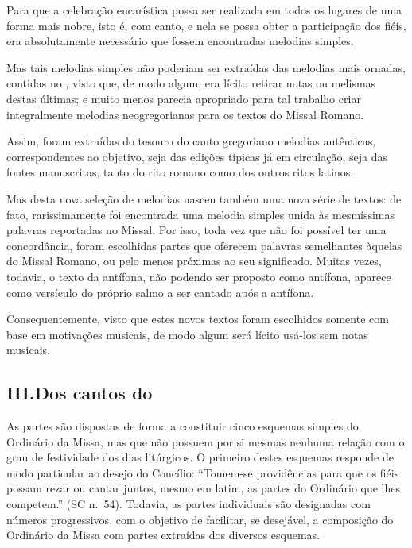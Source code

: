  Para que a celebração eucarística possa ser realizada em todos os lugares de uma forma mais nobre, isto é, com canto, e nela se possa obter a participação dos fiéis, era absolutamente necessário que fossem encontradas melodias simples.

 Mas tais melodias simples não poderiam ser extraídas das melodias mais ornadas, contidas no {\GR}, visto que, de modo algum, era lícito retirar notas ou melismas destas últimas; e muito menos parecia apropriado para tal trabalho criar integralmente melodias neogregorianas para os textos do Missal Romano.

 Assim, foram extraídas do tesouro do canto gregoriano melodias autênticas, correspondentes ao objetivo, seja das edições típicas já em circulação, seja das fontes manuscritas, tanto do rito romano como dos outros ritos latinos.

 Mas desta nova seleção de melodias nasceu também uma nova série de textos: de fato, rarissimamente foi encontrada uma melodia simples unida às mesmíssimas palavras reportadas no Missal. Por isso, toda vez que não foi possível ter uma concordância, foram escolhidas partes que oferecem palavras semelhantes àquelas do Missal Romano, ou pelo menos próximas ao seu significado. Muitas vezes, todavia, o texto da antífona, não podendo ser proposto como antífona, aparece como versículo do próprio salmo a ser cantado após a antífona.

 Consequentemente, visto que estes novos textos foram escolhidos somente com base em motivações musicais, de modo algum será lícito usá-los sem notas musicais.

\subsection{III.\@ Dos cantos do {\KS}}\label{subsection:praenotanda-3}

 As partes são dispostas de forma a constituir cinco esquemas simples do Ordinário da Missa, mas que não possuem por si mesmas nenhuma relação com o grau de festividade dos dias litúrgicos. O primeiro destes esquemas responde de modo particular ao desejo do Concílio: ``Tomem-se providências para que os fiéis possam rezar ou cantar juntos, mesmo em latim, as partes do Ordinário que lhes competem.'' (SC n.\ 54). Todavia, as partes individuais são designadas com números progressivos, com o objetivo de facilitar, se desejável, a composição do Ordinário da Missa com partes extraídas dos diversos esquemas.

